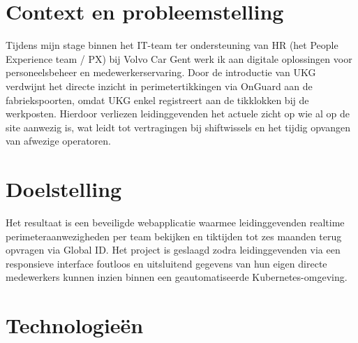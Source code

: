 

\section{Context en probleemstelling}%
\label{vst:context}

Tijdens mijn stage binnen het IT-team ter ondersteuning van HR (het People Experience team / PX) bij Volvo Car Gent werk ik aan digitale oplossingen voor personeelsbeheer en medewerkerservaring. Door de introductie van UKG verdwijnt het directe inzicht in perimetertikkingen via OnGuard aan de fabriekspoorten, omdat UKG enkel registreert aan de tikklokken bij de werkposten. Hierdoor verliezen leidinggevenden het actuele zicht op wie al op de site aanwezig is, wat leidt tot vertragingen bij shiftwissels en het tijdig opvangen van afwezige operatoren.


\section{Doelstelling}%
\label{vst:doelstelling}

Het resultaat is een beveiligde webapplicatie waarmee leidinggevenden realtime perimeteraanwezigheden per team bekijken en tiktijden tot zes maanden terug opvragen via Global ID. Het project is geslaagd zodra leidinggevenden via een responsieve interface foutloos en uitsluitend gegevens van hun eigen directe medewerkers kunnen inzien binnen een geautomatiseerde Ku\-ber\-ne\-tes-om\-ge\-ving.


\section{Technologieën}%
\label{vst:technologieen}

